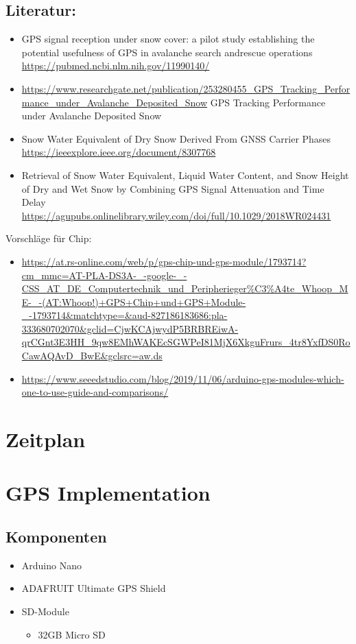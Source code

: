 \documentclass{article}
\begin{document}
\subsection{Literatur:}
\begin{itemize}
\item	
GPS signal reception under snow cover: a pilot study establishing the potential usefulness of GPS in avalanche search andrescue operations \url{https://pubmed.ncbi.nlm.nih.gov/11990140/}
\item	
\url{https://www.researchgate.net/publication/253280455_GPS_Tracking_Performance_under_Avalanche_Deposited_Snow} GPS Tracking Performance under Avalanche Deposited Snow
\item	
Snow Water Equivalent of Dry Snow Derived From GNSS Carrier Phases \url{https://ieeexplore.ieee.org/document/8307768}
\item	
Retrieval of Snow Water Equivalent, Liquid Water Content, and Snow Height of Dry and Wet Snow by Combining GPS Signal Attenuation and Time Delay \url{https://agupubs.onlinelibrary.wiley.com/doi/full/10.1029/2018WR024431}
\end{itemize}
Vorschläge für Chip:
\begin{itemize}
\item	
\url{https://at.rs-online.com/web/p/gps-chip-und-gps-module/1793714?cm_mmc=AT-PLA-DS3A-_-google-_-CSS_AT_DE_Computertechnik_und_Peripherieger%C3%A4te_Whoop_ME-_-(AT:Whoop!)+GPS+Chip+und+GPS+Module-_-1793714&matchtype=&aud-827186183686:pla-333680702070&gclid=CjwKCAjwydP5BRBREiwA-qrCGnt3E3HH_9qw8EMhWAKEcSGWPeI81MjX6XkguFrurs_4tr8YxfDS0RoCawAQAvD_BwE&gclsrc=aw.ds}
\item	
\url{https://www.seeedstudio.com/blog/2019/11/06/arduino-gps-modules-which-one-to-use-guide-and-comparisons/}
\end{itemize}
\section{Zeitplan}

\section{GPS Implementation}

\subsection{Komponenten}

\begin{itemize}
\item Arduino Nano
\item ADAFRUIT Ultimate GPS Shield
\item SD-Module
\begin{itemize}
\item 32GB Micro SD
\end{itemize}
\end{itemize}
\end{document}
